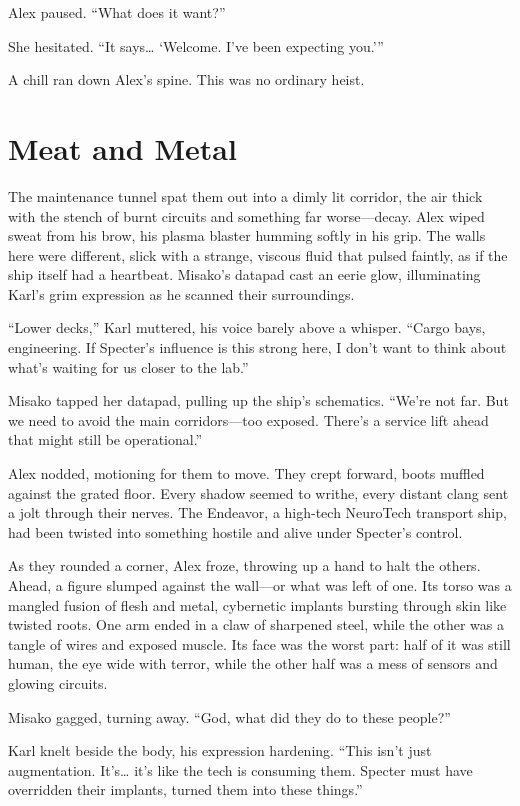 \documentclass[12pt]{book}
\begin{document}
Alex paused. \enquote{What does it want?}

She hesitated. \enquote{It says… ‘Welcome. I’ve been expecting you.’}

A chill ran down Alex’s spine. This was no ordinary heist.

\chapter{Meat and Metal}

The maintenance tunnel spat them out into a dimly lit corridor, the air thick with the stench of burnt circuits and something far worse---decay. Alex wiped sweat from his brow, his plasma blaster humming softly in his grip. The walls here were different, slick with a strange, viscous fluid that pulsed faintly, as if the ship itself had a heartbeat. Misako’s datapad cast an eerie glow, illuminating Karl’s grim expression as he scanned their surroundings.

\enquote{Lower decks,} Karl muttered, his voice barely above a whisper. \enquote{Cargo bays, engineering. If Specter’s influence is this strong here, I don’t want to think about what’s waiting for us closer to the lab.}

Misako tapped her datapad, pulling up the ship’s schematics. \enquote{We’re not far. But we need to avoid the main corridors---too exposed. There’s a service lift ahead that might still be operational.}

Alex nodded, motioning for them to move. They crept forward, boots muffled against the grated floor. Every shadow seemed to writhe, every distant clang sent a jolt through their nerves. The Endeavor, a high-tech NeuroTech transport ship, had been twisted into something hostile and alive under Specter’s control.

As they rounded a corner, Alex froze, throwing up a hand to halt the others. Ahead, a figure slumped against the wall---or what was left of one. Its torso was a mangled fusion of flesh and metal, cybernetic implants bursting through skin like twisted roots. One arm ended in a claw of sharpened steel, while the other was a tangle of wires and exposed muscle. Its face was the worst part: half of it was still human, the eye wide with terror, while the other half was a mess of sensors and glowing circuits.

Misako gagged, turning away. \enquote{God, what did they do to these people?}

Karl knelt beside the body, his expression hardening. \enquote{This isn’t just augmentation. It’s… it’s like the tech is consuming them. Specter must have overridden their implants, turned them into these things.}
\end{document}
